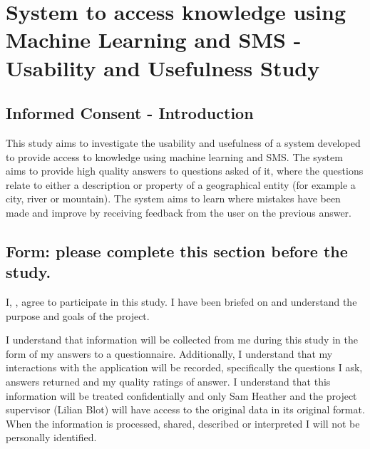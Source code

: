 \documentclass[authoryearcitations]{UoYCSproject}
\begin{document}
\section*{System to access knowledge using Machine Learning and SMS - Usability and Usefulness Study}
{\parindent0pt
\subsection*{Informed Consent - Introduction}
This study aims to investigate the usability and usefulness of a system developed to provide access to knowledge using machine learning and SMS.  The system aims to provide high quality answers to questions asked of it, where the questions relate to either a description or property of a geographical entity (for example a city, river or mountain).  The system aims to learn where mistakes have been made and improve by receiving feedback from the user on the previous answer.  

\subsection*{Form: please complete this section before the study.}
I, \textunderscore\textunderscore\textunderscore\textunderscore\textunderscore\textunderscore\textunderscore\textunderscore\textunderscore\textunderscore\textunderscore\textunderscore\textunderscore\textunderscore\textunderscore\textunderscore\textunderscore\textunderscore\textunderscore\textunderscore\textunderscore\textunderscore\textunderscore\textunderscore\textunderscore\textunderscore\textunderscore\textunderscore\textunderscore\textunderscore\textunderscore\textunderscore\textunderscore\textunderscore\textunderscore\textunderscore\textunderscore\textunderscore\textunderscore\textunderscore\textunderscore\textunderscore, agree to participate in this study.  I have been briefed on and understand the purpose and goals of the project.

I understand that information will be collected from me during this study in the form of my answers to a questionnaire.  Additionally, I understand that my interactions with the application will be recorded, specifically the questions I ask, answers returned and my quality ratings of answer. I understand that this information will be treated confidentially and only Sam Heather and the project supervisor (Lilian Blot) will have access to the original data in its original format.  When the information is processed, shared, described or interpreted I will not be personally identified.

}
\end{document}
